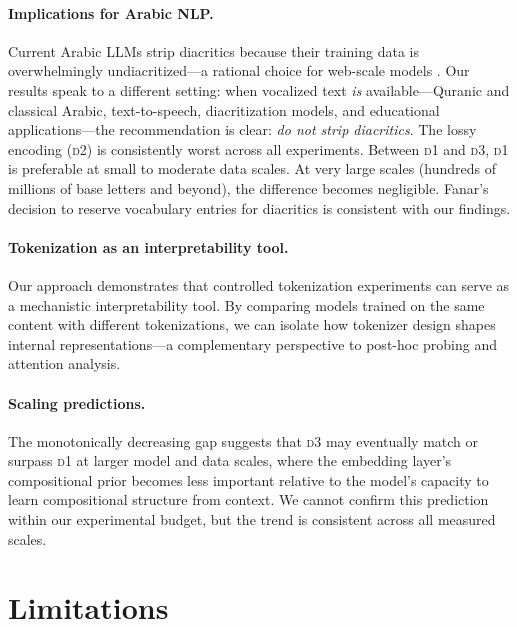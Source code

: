 \documentclass[11pt]{article}
\newcommand{\dOne}{\textsc{d1}}
\newcommand{\dTwo}{\textsc{d2}}
\newcommand{\dThree}{\textsc{d3}}
\begin{document}
\paragraph{Implications for Arabic NLP.}
Current Arabic LLMs strip diacritics because their training data is overwhelmingly undiacritized---a rational choice for web-scale models \cite{sengupta2023jais, antoun2020arabert, inoue2021camelbert}.
Our results speak to a different setting: when vocalized text \emph{is} available---Quranic and classical Arabic, text-to-speech, diacritization models, and educational applications---the recommendation is clear: \emph{do not strip diacritics}.
The lossy encoding (\dTwo{}) is consistently worst across all experiments.
Between \dOne{} and \dThree{}, \dOne{} is preferable at small to moderate data scales.
At very large scales (hundreds of millions of base letters and beyond), the difference becomes negligible.
Fanar's decision to reserve vocabulary entries for diacritics \cite{fanar2025} is consistent with our findings.

\paragraph{Tokenization as an interpretability tool.}
Our approach demonstrates that controlled tokenization experiments can serve as a mechanistic interpretability tool.
By comparing models trained on the same content with different tokenizations, we can isolate how tokenizer design shapes internal representations---a complementary perspective to post-hoc probing and attention analysis.

\paragraph{Scaling predictions.}
The monotonically decreasing gap suggests that \dThree{} may eventually match or surpass \dOne{} at larger model and data scales, where the embedding layer's compositional prior becomes less important relative to the model's capacity to learn compositional structure from context.
We cannot confirm this prediction within our experimental budget, but the trend is consistent across all measured scales.

\section*{Limitations}
\label{sec:limitations}
\end{document}

